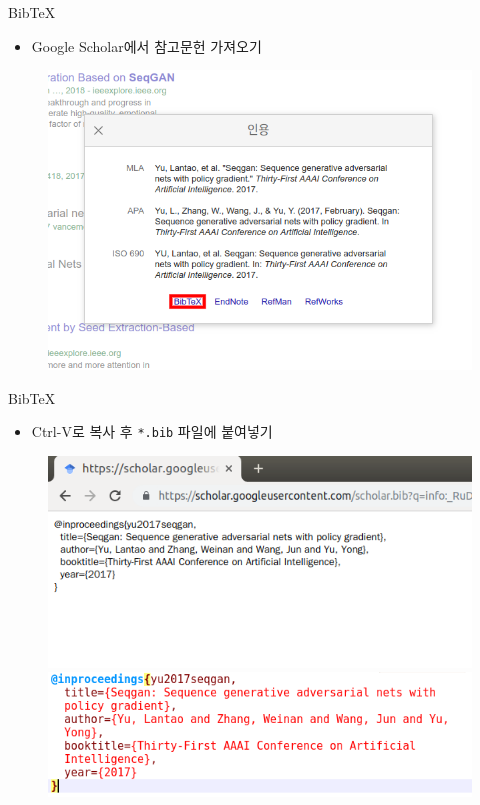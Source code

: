 \documentclass[12pt]{gshs_lecture}
\begin{document}
\begin{frame}[t]{BibTeX}
	\begin{itemize}
		\item Google Scholar에서 참고문헌 가져오기
	\end{itemize}
	\begin{figure}
		\centering
		\includegraphics[width=.8\textwidth, clip, trim = 0cm 1cm 0cm 0cm]{pictures/scholar2.png}
	\end{figure}
\end{frame}

\begin{frame}[t]{BibTeX}
	\begin{itemize}
		\item Ctrl-V로 복사 후 \texttt{*.bib} 파일에 붙여넣기
	\end{itemize}
	\begin{figure}
		\centering
		\includegraphics[width=.7\textwidth, clip, trim = 0cm 1cm 0cm 0cm]{pictures/scholar3.png}
		\includegraphics[width=.7\textwidth]{pictures/scholar4.png}
	\end{figure}
\end{frame}
\end{document}
